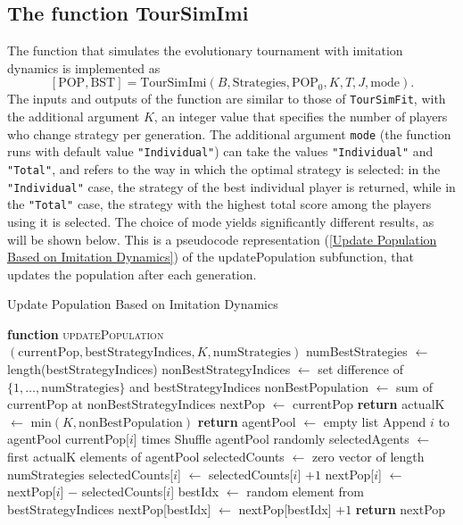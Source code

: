 \subsection{The function TourSimImi}
The function that simulates the evolutionary tournament with imitation dynamics is implemented as
\[
[\text{POP}, \text{BST}] = \text{TourSimImi}(B, \text{Strategies}, \text{POP}_0, K, T, J, \text{mode}).
\]
The inputs and outputs of the function are similar to those of \texttt{TourSimFit}, with the additional argument \( K \), an integer value that specifies the number of players who change strategy per generation. The additional argument \texttt{mode} (the function runs with default value \texttt{"Individual"}) can take the values \texttt{"Individual"} and \texttt{"Total"}, and refers to the way in which the optimal strategy is selected: in the \texttt{"Individual"} case, the strategy of the best individual player is returned, while in the \texttt{"Total"} case, the strategy with the highest total score among the players using it is selected. The choice of mode yields significantly different results, as will be shown below. This is a pseudocode representation (\ref{Update Population Based on Imitation Dynamics}) of the updatePopulation subfunction, that updates the population after each generation.

\begin{algorithm}
\caption{Update Population Based on Imitation Dynamics}
\label{Update Population Based on Imitation Dynamics}
\begin{algorithmic}[1]
\STATE \textbf{function} \textsc{updatePopulation}$(\text{currentPop}, \text{bestStrategyIndices}, K, \text{numStrategies})$
\STATE numBestStrategies $\leftarrow$ length(bestStrategyIndices)
\STATE nonBestStrategyIndices $\leftarrow$ set difference of $\{1, \dots, \text{numStrategies}\}$ and bestStrategyIndices
\STATE nonBestPopulation $\leftarrow$ sum of currentPop at nonBestStrategyIndices
\STATE nextPop $\leftarrow$ currentPop
    \STATE \textbf{return}
\ENDIF
\STATE actualK $\leftarrow$ min$(K, \text{nonBestPopulation})$
    \STATE \textbf{return}
\ENDIF
\STATE agentPool $\leftarrow$ empty list
        \STATE Append $i$ to agentPool currentPop[$i$] times
    \ENDIF
\ENDFOR
{}
    \STATE Shuffle agentPool randomly
    \STATE selectedAgents $\leftarrow$ first actualK elements of agentPool
    \STATE selectedCounts $\leftarrow$ zero vector of length numStrategies
        \STATE selectedCounts[$i$] $\leftarrow$ selectedCounts[$i$] $+ 1$
    \ENDFOR
            \STATE nextPop[$i$] $\leftarrow$ nextPop[$i$] $-$ selectedCounts[$i$]
                \STATE bestIdx $\leftarrow$ random element from bestStrategyIndices
                \STATE nextPop[bestIdx] $\leftarrow$ nextPop[bestIdx] $+ 1$
            \ENDFOR
        \ENDIF
    \ENDFOR
\ENDIF
\STATE \textbf{return} nextPop
\end{algorithmic}
\end{algorithm}

